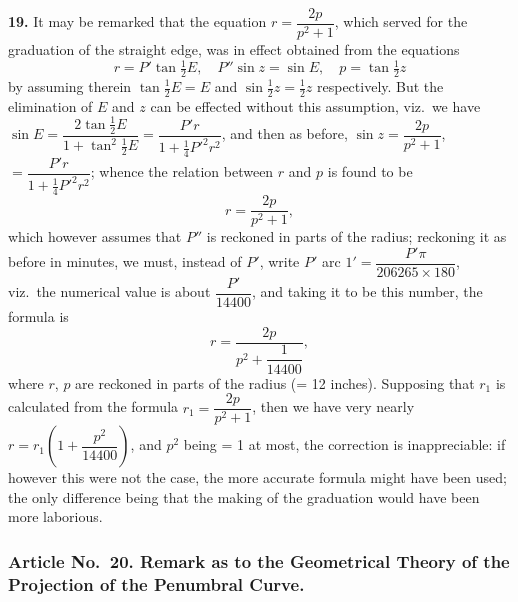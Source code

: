 \documentclass[11pt,a4paper]{article}
\begin{document}
\noindent\textbf{19.} It may be remarked that the equation $r = \dfrac{2p}{p^{2}+1}$, which served for the graduation of the straight edge, was in effect obtained from the equations
\[
r = P' \tan \tfrac{1}{2}E, \quad P'' \sin z = \sin E, \quad p = \tan \tfrac{1}{2}z
\]
by assuming therein $\tan \tfrac{1}{2}E = E$ and $\sin \tfrac{1}{2}z = \tfrac{1}{2}z$ respectively. But the elimination of $E$ and $z$ can be effected without this assumption, viz.\ we have $\sin E = \dfrac{2\tan \tfrac{1}{2}E}{1 + \tan^{2}\tfrac{1}{2}E} = \dfrac{P'r}{1 + \tfrac{1}{4}P'^{2}r^{2}}$, and then as before, $\sin z = \dfrac{2p}{p^{2}+1}$, $= \dfrac{P'r}{1 + \tfrac{1}{4}P'^{2}r^{2}}$; whence the relation between $r$ and $p$ is found to be
\[
r = \frac{2p}{p^{2}+1},
\]
which however assumes that $P''$ is reckoned in parts of the radius; reckoning it as before in minutes, we must, instead of $P'$, write $P'$ arc $1' = \dfrac{P'\pi}{206265 \times 180}$, viz.\ the numerical value is about $\dfrac{P'}{14400}$, and taking it to be this number, the formula is
\[
r = \frac{2p}{p^{2} + \dfrac{1}{14400}},
\]
where $r$, $p$ are reckoned in parts of the radius (= 12 inches). Supposing that $r_{1}$ is calculated from the formula $r_{1} = \dfrac{2p}{p^{2}+1}$, then we have very nearly $r = r_{1}\left(1 + \dfrac{p^{2}}{14400}\right)$, and $p^{2}$ being = 1 at most, the correction is inappreciable: if however this were not the case, the more accurate formula might have been used; the only difference being that the making of the graduation would have been more laborious.

\subsubsection*{Article No.\ 20. Remark as to the Geometrical Theory of the Projection of the Penumbral Curve.}
\end{document}
